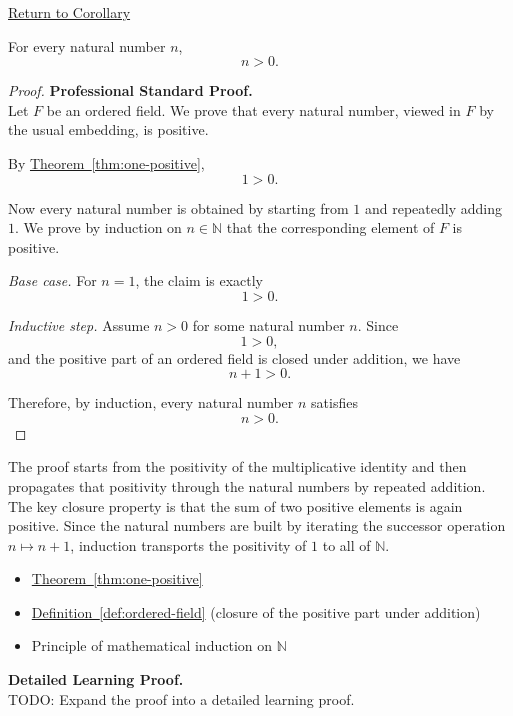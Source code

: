 \newpage
{}
\label{prf:n-positive}

\begin{remark*}[Return]
\hyperref[cor:n-positive]{Return to Corollary}
\end{remark*}

\begin{theorem*}
For every natural number $n$,
\[
n>0.
\]
\end{theorem*}

\begin{proof}
\textbf{Professional Standard Proof.}~\\
Let $F$ be an ordered field.  We prove that every natural number, viewed in
$F$ by the usual embedding, is positive.

By \hyperref[thm:one-positive]{Theorem~\ref*{thm:one-positive}},
\[
1>0.
\]

Now every natural number is obtained by starting from $1$ and repeatedly
adding $1$.  We prove by induction on $n\in\mathbb{N}$ that the
corresponding element of $F$ is positive.

\emph{Base case.}  For $n=1$, the claim is exactly
\[
1>0.
\]

\emph{Inductive step.}  Assume $n>0$ for some natural number $n$.  Since
\[
1>0,
\]
and the positive part of an ordered field is closed under addition, we have
\[
n+1>0.
\]

Therefore, by induction, every natural number $n$ satisfies
\[
n>0.
\]
\end{proof}

\begin{remark*}
The proof starts from the positivity of the multiplicative identity and then
propagates that positivity through the natural numbers by repeated addition.
The key closure property is that the sum of two positive elements is again
positive.  Since the natural numbers are built by iterating the successor
operation $n\mapsto n+1$, induction transports the positivity of $1$ to all
of $\mathbb{N}$.
\end{remark*}

\begin{dependencies}
\begin{itemize}
  \item \hyperref[thm:one-positive]{Theorem~\ref*{thm:one-positive}}
  \item \hyperref[def:ordered-field]{Definition~\ref*{def:ordered-field}}
        \textnormal{(closure of the positive part under addition)}
  \item Principle of mathematical induction on $\mathbb{N}$
\end{itemize}
\end{dependencies}

\textbf{Detailed Learning Proof.}~\\
TODO: Expand the proof into a detailed learning proof.

